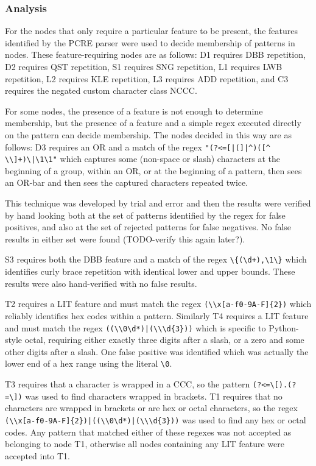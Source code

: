 \subsubsection{Analysis}
\label{communityanalysis}
For the nodes that only require a particular feature to be present, the features identified by the PCRE parser were used to decide membership of patterns in nodes.  These feature-requiring nodes are as follows: D1 requires DBB repetition, D2 requires QST repetition, S1 requires SNG repetition, L1 requires LWB repetition, L2 requires KLE repetition, L3 requires ADD repetition, and C3 requires the negated custom character class NCCC.

For some nodes, the presence of a feature is not enough to determine membership, but the presence of a feature and a simple regex executed directly on the pattern can decide membership.  The nodes decided in this way are as follows: D3 requires an OR and a match of the regex \verb!"(?<=[|(]|^)([^ \\]+)\|\1\1"! which captures some (non-space or slash) characters at the beginning of a group, within an OR, or at the beginning of a pattern, then sees an OR-bar and then sees the captured characters repeated twice.

This technique was developed by trial and error and then the results were verified by hand looking both at the set of patterns identified by the regex for false positives, and also at the set of rejected patterns for false negatives.  No false results in either set were found (TODO-verify this again later?).


S3 requires both the DBB feature and a match of the regex \verb!\{(\d+),\1\}! which identifies curly brace repetition with identical lower and upper bounds.  These results were also hand-verified with no false results.


T2 requires a LIT feature and must match the regex \verb!(\\x[a-f0-9A-F]{2})! which reliably identifies hex codes within a pattern.  Similarly T4 requires a LIT feature and must match the regex \verb!((\\0\d*)|(\\\d{3}))! which is specific to Python-style octal, requiring either exactly three digits after a slash, or a zero and some other digits after a slash.  One false positive was identified which was actually the lower end of a hex range using the literal \verb!\0!.

T3 requires that a character is wrapped in a CCC, so the pattern \verb!(?<=\[).(?=\])! was used to find characters wrapped in brackets.  T1 requires that no characters are wrapped in brackets or are hex or octal characters, so the regex \verb!(\\x[a-f0-9A-F]{2})|((\\0\d*)|(\\\d{3}))! was used to find any hex or octal codes.  Any pattern that matched either of these regexes was not accepted as belonging to node T1, otherwise all nodes containing any LIT feature were accepted into T1.

